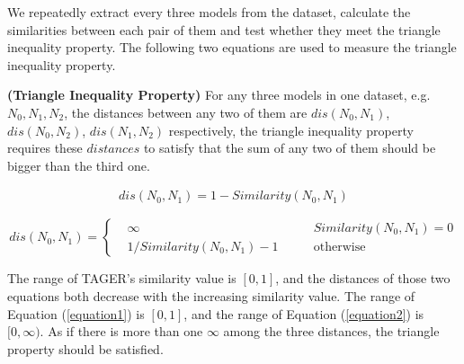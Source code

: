 \documentclass{llncs}
\begin{document}
We repeatedly extract every three models from the dataset, calculate the similarities between each pair of them and test whether they meet the triangle inequality property. The following two equations \cite{kunze2011metric} are used to measure the triangle inequality property. 
\begin{definition}\textbf{(Triangle Inequality Property)}
For any three models in one dataset, e.g. $N_{0},N_{1},N_{2}$, the distances between any two of them are $dis(N_{0},N_{1})$, $dis(N_{0},N_{2})$, $dis(N_{1},N_{2})$ respectively, the triangle inequality property requires these $distances$ to satisfy that the sum of any two of them should be bigger than the third one.
\end{definition}
\begin{equation}\label{equation1}
\begin{aligned}
dis(N_{0},N_{1}) = 1 - Similarity(N_{0},N_{1})
\end{aligned}
\end{equation}

\begin{equation}\label{equation2}
dis(N_{0},N_{1})=\left\{
	\begin{array}{rcl}
	&\infty \qquad & Similarity(N_{0},N_{1})=0\\
	&1/Similarity(N_{0},N_{1})-1 \qquad & \text{otherwise}
	\end{array}\right.
\end{equation}

The range of TAGER's similarity value is $[0, 1]$, and the distances of those two equations both decrease with the increasing similarity value. The range of Equation (\ref{equation1}) is $[0, 1]$, and the range of Equation (\ref{equation2}) is $[0, \infty)$. As if there is more than one $\infty$ among the three distances, the triangle property should be satisfied.
\end{document}
